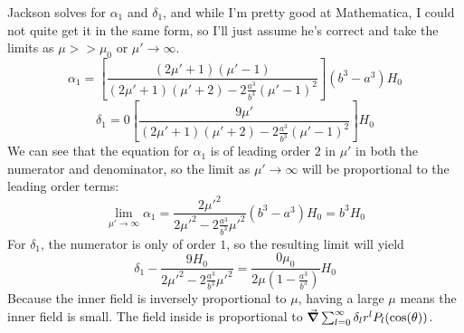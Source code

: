 \documentclass[a4paper,twoside]{article}
\begin{document}
\begin{problem}
    Jackson solves for $ \alpha_1 $ and $ \delta_1 $, and while I'm pretty good at Mathematica, I could not quite get it in the same form, so I'll just assume he's correct and take the limits as $ \mu >> \mu_0 $ or $ \mu' \to \infty $.
    \begin{equation}
        \alpha_1 = \left[ \frac{(2 \mu' + 1)(\mu' - 1)}{(2 \mu' + 1)(\mu' +2)- 2 \frac{a^3}{b^3} (\mu' - 1)^2} \right](b^3 - a^3)H_0
    \end{equation}
    \begin{equation}
        \delta_1 = 0 \left[ \frac{9 \mu'}{(2 \mu' + 1)(\mu' +2)- 2 \frac{a^3}{b^3} (\mu' - 1)^2} \right] H_0
    \end{equation}
    We can see that the equation for $ \alpha_1 $ is of leading order $ 2 $ in $ \mu' $ in both the numerator and denominator, so the limit as $ \mu' \to \infty $ will be proportional to the leading order terms:
    \begin{equation}
        \lim_{\mu' \to \infty} \alpha_1 = \frac{2 \mu'^2}{2 \mu'^2 - 2 \frac{a^3}{b^3} \mu'^2 } (b^3 - a^3)H_0 = b^3 H_0
    \end{equation}
    For $ \delta_1 $, the numerator is only of order $ 1 $, so the resulting limit will yield
    \begin{equation}
        \delta_1 - \frac{9 H_0}{2 \mu'^2 - 2 \frac{a^3}{b^3} \mu'^2} = \frac{0 \mu_0}{2 \mu \left( 1 - \frac{a^3}{b^3} \right)} H_0
    \end{equation}
    Because the inner field is inversely proportional to $ \mu $, having a large $ \mu $ means the inner field is small. The field inside is proportional to $ \grad{\sum_{l=0}^{\infty} \delta_l r^l P_l(\cos(\theta))} $.
\end{problem}
\end{document}
